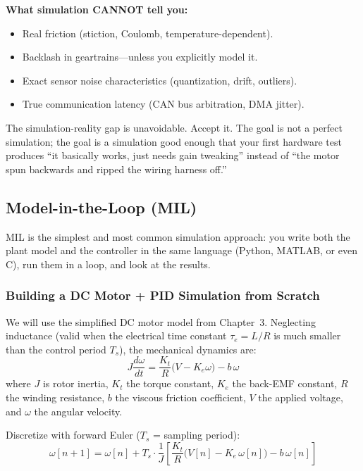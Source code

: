 \textbf{What simulation CANNOT tell you:}
\begin{itemize}
    \item Real friction (stiction, Coulomb, temperature-dependent).
    \item Backlash in geartrains---unless you explicitly model it.
    \item Exact sensor noise characteristics (quantization, drift, outliers).
    \item True communication latency (CAN bus arbitration, DMA jitter).
\end{itemize}

The simulation-reality gap is unavoidable. Accept it. The goal is not a
perfect simulation; the goal is a simulation good enough that your first
hardware test produces ``it basically works, just needs gain tweaking'' instead
of ``the motor spun backwards and ripped the wiring harness off.''

\subsection{Model-in-the-Loop (MIL)}

MIL is the simplest and most common simulation approach: you write both the
plant model and the controller in the same language (Python, MATLAB, or even
C), run them in a loop, and look at the results.

\subsubsection{Building a DC Motor + PID Simulation from Scratch}

We will use the simplified DC motor model from Chapter~3. Neglecting
inductance (valid when the electrical time constant $\tau_e = L/R$ is much
smaller than the control period $T_s$), the mechanical dynamics are:
\begin{equation}
J \frac{d\omega}{dt} = \frac{K_t}{R}\bigl(V - K_e \omega\bigr) - b\,\omega
\end{equation}
where $J$ is rotor inertia, $K_t$ the torque constant, $K_e$ the back-EMF
constant, $R$ the winding resistance, $b$ the viscous friction coefficient,
$V$ the applied voltage, and $\omega$ the angular velocity.

Discretize with forward Euler ($T_s$ = sampling period):
\begin{equation}
\omega[n+1] = \omega[n] + T_s \cdot
    \frac{1}{J}\left[\frac{K_t}{R}\bigl(V[n] - K_e\,\omega[n]\bigr)
    - b\,\omega[n]\right]
\end{equation}

